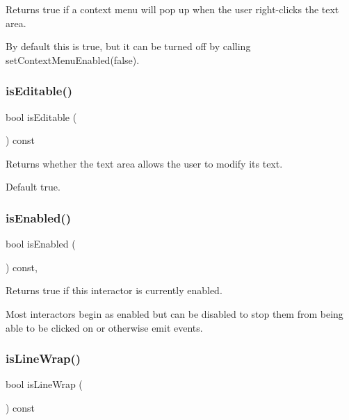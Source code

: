 Returns true if a context menu will pop up when the user right-\/clicks the text area. 

By default this is true, but it can be turned off by calling set\+Context\+Menu\+Enabled(false). \mbox{\label{classGTextArea_a012b5afb54e037e6c5498cf0932a521b}} 
\subsubsection{\texorpdfstring{is\+Editable()}{isEditable()}}
{\footnotesize\ttfamily bool is\+Editable (\begin{DoxyParamCaption}{ }\end{DoxyParamCaption}) const\hspace{0.3cm}{\ttfamily [virtual]}}



Returns whether the text area allows the user to modify its text. 

Default true. \mbox{\label{classGInteractor_aacb819fb241851fd9fc045271baa4034}} 
\subsubsection{\texorpdfstring{is\+Enabled()}{isEnabled()}}
{\footnotesize\ttfamily bool is\+Enabled (\begin{DoxyParamCaption}{ }\end{DoxyParamCaption}) const\hspace{0.3cm}{\ttfamily [virtual]}, {\ttfamily [inherited]}}



Returns true if this interactor is currently enabled. 

Most interactors begin as enabled but can be disabled to stop them from being able to be clicked on or otherwise emit events. \mbox{\label{classGTextArea_ae09e72290b6e8a23bcc77752da6dffa5}} 
\subsubsection{\texorpdfstring{is\+Line\+Wrap()}{isLineWrap()}}
{\footnotesize\ttfamily bool is\+Line\+Wrap (\begin{DoxyParamCaption}{ }\end{DoxyParamCaption}) const\hspace{0.3cm}{\ttfamily [virtual]}}



